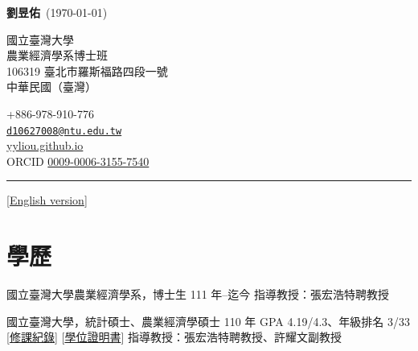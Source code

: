 \documentclass[11pt,letterpaper]{article}
\newlength{\cvindent}
\newlength{\cvcontactwidth}
\newcommand{\cvrule}{\par\noindent\hspace*{-\cvindent}%
  \rule{\dimexpr\textwidth+\cvindent\relax}{0.6pt}\par}
\begin{document}
\noindent\hspace*{-\cvindent}%
\begin{minipage}{\dimexpr\textwidth+\cvindent\relax}
  \raggedright
  {\large\bfseries 劉昱佑}\ {\normalsize (\apstylekinda\today)}

  \vspace{3pt}

  \noindent\hspace*{\cvindent}%
  \begin{minipage}[t]{\dimexpr\linewidth-\cvindent-\cvcontactwidth-1em\relax}\small\raggedright
    國立臺灣大學\\農業經濟學系博士班\\106319
臺北市羅斯福路四段一號\\中華民國（臺灣）
  \end{minipage}\hfill
  \begin{minipage}[t]{\cvcontactwidth}\small\raggedleft
    +886-978-910-776\\\href{mailto:d10627008@ntu.edu.tw}{\nolinkurl{d10627008@ntu.edu.tw}}\\\href{https://yyliou.github.io}{yyliou.github.io}\\ORCID
\href{https://orcid.org/0009-0006-3155-7540}{0009-0006-3155-7540}
  \end{minipage}
\end{minipage}

\vspace{6pt}
\cvrule
\vspace{-6pt}

{\raggedleft\small[\href{https://yyliou.github.io/yyliou/cv/cv_simple.pdf}{English version}]\par}

\section{學歷}\label{ux5b78ux6b77}

國立臺灣大學農業經濟學系，博士生 \hfill 111 年--迄今
\newline 指導教授：張宏浩特聘教授

國立臺灣大學，統計碩士、農業經濟學碩士 \hfill 110 年 \newline GPA
4.19/4.3、年級排名 3/33
{[}\href{https://yyliou.github.io/yyliou/cv/doc/ms-transcript-zh.pdf}{修課紀錄}{]}
{[}\href{https://yyliou.github.io/yyliou/cv/doc/ms-certificate-zh.pdf}{學位證明書}{]}
\newline 指導教授：張宏浩特聘教授、許耀文副教授
\end{document}
